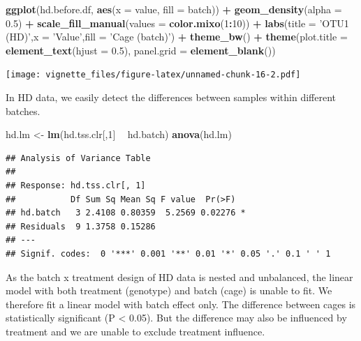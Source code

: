 \documentclass[]{book}
\newenvironment{Shaded}{\begin{snugshade}}{\end{snugshade}}
\newcommand{\KeywordTok}[1]{\textcolor[rgb]{0.13,0.29,0.53}{\textbf{#1}}}
\newcommand{\DataTypeTok}[1]{\textcolor[rgb]{0.13,0.29,0.53}{#1}}
\newcommand{\DecValTok}[1]{\textcolor[rgb]{0.00,0.00,0.81}{#1}}
\newcommand{\FloatTok}[1]{\textcolor[rgb]{0.00,0.00,0.81}{#1}}
\newcommand{\StringTok}[1]{\textcolor[rgb]{0.31,0.60,0.02}{#1}}
\newcommand{\OperatorTok}[1]{\textcolor[rgb]{0.81,0.36,0.00}{\textbf{#1}}}
\newcommand{\NormalTok}[1]{#1}
\begin{document}
\begin{Shaded}
\begin{Highlighting}[]
\KeywordTok{ggplot}\NormalTok{(hd.before.df, }\KeywordTok{aes}\NormalTok{(}\DataTypeTok{x =}\NormalTok{ value, }\DataTypeTok{fill =}\NormalTok{ batch)) }\OperatorTok{+}\StringTok{ }
\StringTok{  }\KeywordTok{geom_density}\NormalTok{(}\DataTypeTok{alpha =} \FloatTok{0.5}\NormalTok{) }\OperatorTok{+}\StringTok{ }\KeywordTok{scale_fill_manual}\NormalTok{(}\DataTypeTok{values =} \KeywordTok{color.mixo}\NormalTok{(}\DecValTok{1}\OperatorTok{:}\DecValTok{10}\NormalTok{)) }\OperatorTok{+}\StringTok{ }
\StringTok{  }\KeywordTok{labs}\NormalTok{(}\DataTypeTok{title =} \StringTok{'OTU1 (HD)'}\NormalTok{,}\DataTypeTok{x =} \StringTok{'Value'}\NormalTok{,}\DataTypeTok{fill =} \StringTok{'Cage (batch)'}\NormalTok{) }\OperatorTok{+}\StringTok{ }
\StringTok{  }\KeywordTok{theme_bw}\NormalTok{() }\OperatorTok{+}\StringTok{ }\KeywordTok{theme}\NormalTok{(}\DataTypeTok{plot.title =} \KeywordTok{element_text}\NormalTok{(}\DataTypeTok{hjust =} \FloatTok{0.5}\NormalTok{), }
                     \DataTypeTok{panel.grid =} \KeywordTok{element_blank}\NormalTok{())}
\end{Highlighting}
\end{Shaded}

\texttt{[image: vignette\_files/figure-latex/unnamed-chunk-16-2.pdf]}

In HD data, we easily detect the differences between samples within
different batches.

\begin{Shaded}
\begin{Highlighting}[]
\NormalTok{hd.lm <-}\StringTok{ }\KeywordTok{lm}\NormalTok{(hd.tss.clr[,}\DecValTok{1}\NormalTok{] }\OperatorTok{~}\StringTok{ }\NormalTok{hd.batch)}
\KeywordTok{anova}\NormalTok{(hd.lm)}
\end{Highlighting}
\end{Shaded}

\begin{verbatim}
## Analysis of Variance Table
## 
## Response: hd.tss.clr[, 1]
##           Df Sum Sq Mean Sq F value  Pr(>F)  
## hd.batch   3 2.4108 0.80359  5.2569 0.02276 *
## Residuals  9 1.3758 0.15286                  
## ---
## Signif. codes:  0 '***' 0.001 '**' 0.01 '*' 0.05 '.' 0.1 ' ' 1
\end{verbatim}

As the batch x treatment design of HD data is nested and unbalanced, the
linear model with both treatment (genotype) and batch (cage) is unable
to fit. We therefore fit a linear model with batch effect only. The
difference between cages is statistically significant (P \textless{}
0.05). But the difference may also be influenced by treatment and we are
unable to exclude treatment influence.
\end{document}
